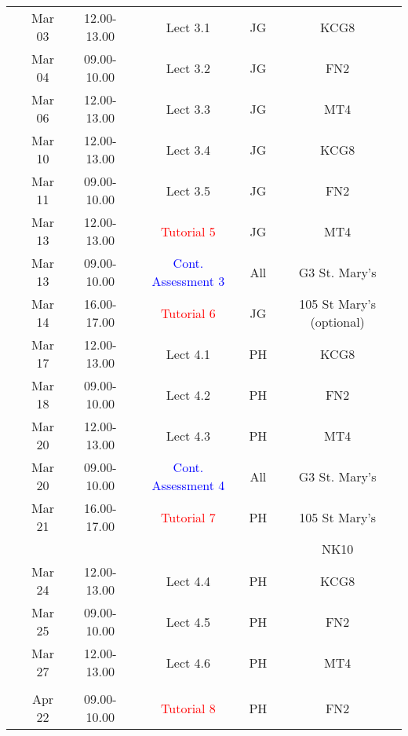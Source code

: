 \documentclass[11pt,oneside,a4paper]{article}
\begin{document}
\begin{center}
\begin{tabular}{||c||c|c|c|c|c||}
\hline
\multirow{3}{*}{\color{red}{Week 34}} & Mar 03   & 12.00-13.00 & Lect  3.1  & JG  & KCG8 \\
                                      & Mar 04   & 09.00-10.00 & Lect  3.2  & JG  & FN2  \\
                                      & Mar 06   & 12.00-13.00 & Lect  3.3  & JG  & MT4  \\
\hline
\multirow{3}{*}{\color{red}{Week 35}} & Mar 10   & 12.00-13.00 & Lect  3.4  & JG  & KCG8 \\
                                      & Mar 11   & 09.00-10.00 & Lect  3.5  & JG  & FN2  \\
                                      & Mar 13   & 12.00-13.00 & \textcolor{red}{Tutorial 5} & JG  & MT4  \\
                                      & Mar 13   & 09.00-10.00 & \textcolor{blue}{Cont. Assessment 3}& All  &  G3 St. Mary's \\
                                      & Mar 14   & 16.00-17.00 & \textcolor{red}{Tutorial 6} & JG  & 105 St Mary's (optional)\\
\hline
\multirow{3}{*}{\color{red}{Week 36}} & Mar 17   & 12.00-13.00 & Lect  4.1  & PH  & KCG8 \\
                                      & Mar 18   & 09.00-10.00 & Lect  4.2  & PH  & FN2  \\
                                      & Mar 20   & 12.00-13.00 & Lect  4.3  & PH  & MT4  \\
                                      & Mar 20   & 09.00-10.00 & \textcolor{blue}{Cont. Assessment 4}& All  &  G3 St. Mary's \\
                                      & Mar 21   & 16.00-17.00 & \textcolor{red}{Tutorial 7} & PH  & 105 St Mary's\\
                                      &          &             &             &     & NK10 \\
\hline
\multirow{3}{*}{\color{red}{Week 37}} & Mar 24   & 12.00-13.00 & Lect  4.4  & PH  & KCG8 \\
                                      & Mar 25   & 09.00-10.00 & Lect  4.5  & PH  & FN2  \\
                                      & Mar 27   & 12.00-13.00 & Lect  4.6  & PH  & MT4  \\
\hline\hline
                                      &          &             &             &     &               \\
\hline\hline
\multirow{2}{*}{\color{red}{Week 41}} & Apr 22   & 09.00-10.00 & \textcolor{red}{Tutorial 8}  & PH  & FN2  \\

\end{tabular}
\end{center}
\end{document}
